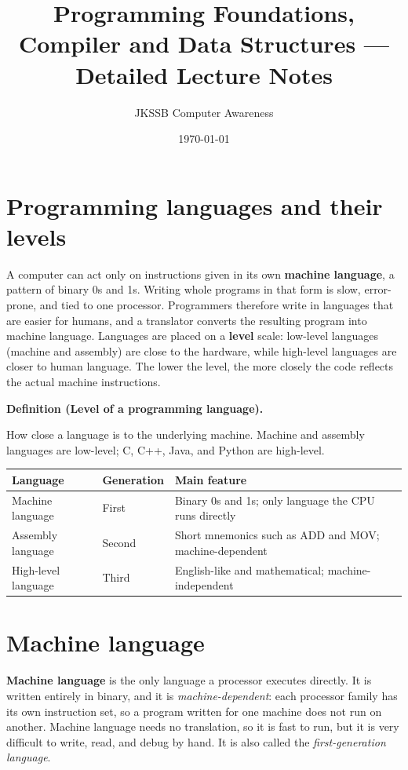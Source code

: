 \documentclass[11pt]{article}
\title{Programming Foundations, Compiler and Data Structures --- Detailed Lecture Notes}
\author{JKSSB Computer Awareness}
\date{\today}
\newenvironment{definitionbox}[1]{%
  \par\noindent\textbf{Definition (#1).}\ \itshape
}{\par\vspace{0.3em}}
\begin{document}
\maketitle

\section{Programming languages and their levels}
A computer can act only on instructions given in its own \textbf{machine
language}, a pattern of binary 0s and 1s. Writing whole programs in that form
is slow, error-prone, and tied to one processor. Programmers therefore write
in languages that are easier for humans, and a translator converts the
resulting program into machine language. Languages are placed on a
\textbf{level} scale: low-level languages (machine and assembly) are close to
the hardware, while high-level languages are closer to human language. The
lower the level, the more closely the code reflects the actual machine
instructions.

\begin{definitionbox}{Level of a programming language}
How close a language is to the underlying machine. Machine and assembly
languages are low-level; C, C++, Java, and Python are high-level.
\end{definitionbox}

\begin{center}
\begin{tabular}{p{}p{}p{}}
\toprule
\textbf{Language} & \textbf{Generation} & \textbf{Main feature} \\
\midrule
Machine language & First & Binary 0s and 1s; only language the CPU runs directly \\
Assembly language & Second & Short mnemonics such as ADD and MOV; machine-dependent \\
High-level language & Third & English-like and mathematical; machine-independent \\
\bottomrule
\end{tabular}
\end{center}

\section{Machine language}
\textbf{Machine language} is the only language a processor executes directly.
It is written entirely in binary, and it is \emph{machine-dependent}: each
processor family has its own instruction set, so a program written for one
machine does not run on another. Machine language needs no translation, so it
is fast to run, but it is very difficult to write, read, and debug by hand. It
is also called the \emph{first-generation language}.
\end{document}
